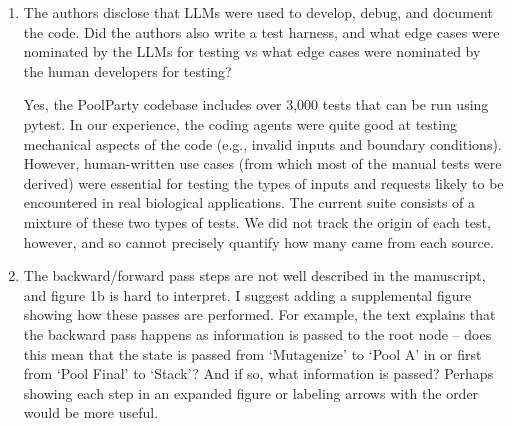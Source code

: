 \documentclass[11pt]{article}
\newenvironment{response}{\par\color{responseblue}}{\par}
\newenvironment{msquote}
  {\begin{quote}\color{responseblue}\itshape\noindent\ignorespaces}
  {\end{quote}}
\begin{document}
\begin{enumerate}

\item The authors disclose that LLMs were used to develop, debug, and document the code. Did the authors also write a test harness, and what edge cases were nominated by the LLMs for testing vs what edge cases were nominated by the human developers for testing?

\begin{response}
Yes, the PoolParty codebase includes over 3{,}000 tests that can be run using pytest. In our experience, the coding agents were quite good at testing mechanical aspects of the code (e.g., invalid inputs and boundary conditions). However, human-written use cases (from which most of the manual tests were derived) were essential for testing the types of inputs and requests likely to be encountered in real biological applications. The current suite consists of a mixture of these two types of tests. We did not track the origin of each test, however, and so cannot precisely quantify how many came from each source.  
\end{response}


\item The backward/forward pass steps are not well described in the manuscript,
and figure 1b is hard to interpret. I suggest adding a supplemental figure
showing how these passes are performed. For example, the text explains that the
backward pass happens as information is passed to the root node -- does this
mean that the state is passed from `Mutagenize' to `Pool A' in or first from
`Pool Final' to `Stack'? And if so, what information is passed? Perhaps showing
each step in an expanded figure or labeling arrows with the order would be more
useful.


\end{enumerate}
\end{document}
